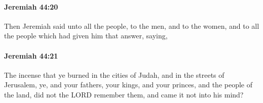 		\paragraph{Jeremiah 44:20} %
			\label{JEREMIAH-44-20}

			Then Jeremiah said unto all the people, to the men, and to the women, and to all the people which had given him that answer, saying,


		\paragraph{Jeremiah 44:21} %
			\label{JEREMIAH-44-21}

			The incense that ye burned in the cities of Judah, and in the streets of Jerusalem, ye, and your fathers, your kings, and your princes, and the people of the land, did not the LORD remember them, and came it not into his mind?


